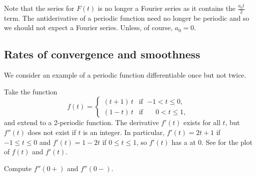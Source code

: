 Note that the series for $F(t)$ is no longer a Fourier series as it contains
the $\frac{a_0 t}{2}$ term.  The antiderivative
of a periodic function need no longer be periodic and so we should not
expect a Fourier series.  Unless, of course, $a_0 = 0$.

\subsection{Rates of convergence and smoothness}

We consider an example of a periodic function differentiable once but not
twice.

\begin{example}
Take the function
\begin{equation*}
f(t) =
\begin{cases}
(t+1)\,t & \text{if } \; {-1} < t \leq 0 , \\
(1-t)\,t & \text{if } \; \phantom{-}0 < t \leq 1 ,
\end{cases}
\end{equation*}
and extend to a
2-periodic function.
The derivative $f'(t)$ exists for all $t$, but $f''(t)$
does not exist if $t$ is an integer.
In particular,
$f'(t) = 2t+1$ if $-1 \leq t \leq 0$ and $f'(t) = 1-2t$ if
$0 \leq t \leq 1$, so $f'(t)$ has a  at $0$.
See
for the plot of $f(t)$ and $f'(t)$.


\begin{myfig}
\capstart
{}
\caption{Smooth 2-periodic function (the smooth line) with its nonsmooth derivative
(the jagged line).\label{gfs:smoothexfig}}
\end{myfig}


\begin{exercise}
Compute $f''(0+)$ and $f''(0-)$.
\end{exercise}


\end{example}
